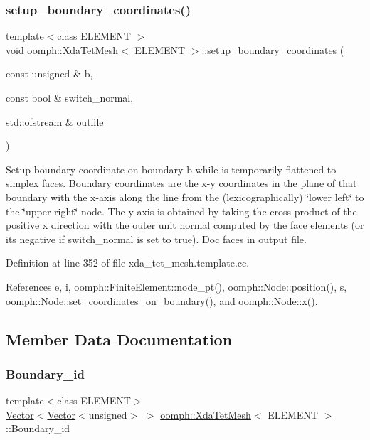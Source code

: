 \subsubsection{\texorpdfstring{setup\+\_\+boundary\+\_\+coordinates()}{setup\_boundary\_coordinates()}\hspace{0.1cm}{\footnotesize\ttfamily [2/2]}}
{\footnotesize\ttfamily template$<$class E\+L\+E\+M\+E\+NT $>$ \\
void \hyperlink{classoomph_1_1XdaTetMesh}{oomph\+::\+Xda\+Tet\+Mesh}$<$ E\+L\+E\+M\+E\+NT $>$\+::setup\+\_\+boundary\+\_\+coordinates (\begin{DoxyParamCaption}\item[{const unsigned \&}]{b,  }\item[{const bool \&}]{switch\+\_\+normal,  }\item[{std\+::ofstream \&}]{outfile }\end{DoxyParamCaption})}

Setup boundary coordinate on boundary b while is temporarily flattened to simplex faces. Boundary coordinates are the x-\/y coordinates in the plane of that boundary with the x-\/axis along the line from the (lexicographically) \char`\"{}lower left\char`\"{} to the \char`\"{}upper right\char`\"{} node. The y axis is obtained by taking the cross-\/product of the positive x direction with the outer unit normal computed by the face elements (or its negative if switch\+\_\+normal is set to true). Doc faces in output file. 

Definition at line 352 of file xda\+\_\+tet\+\_\+mesh.\+template.\+cc.



References e, i, oomph\+::\+Finite\+Element\+::node\+\_\+pt(), oomph\+::\+Node\+::position(), s, oomph\+::\+Node\+::set\+\_\+coordinates\+\_\+on\+\_\+boundary(), and oomph\+::\+Node\+::x().



\subsection{Member Data Documentation}
\mbox{\label{classoomph_1_1XdaTetMesh_a1774abc96e730c89e95b99933a7c0ae3}} 
\subsubsection{\texorpdfstring{Boundary\+\_\+id}{Boundary\_id}}
{\footnotesize\ttfamily template$<$class E\+L\+E\+M\+E\+NT$>$ \\
\hyperlink{classoomph_1_1Vector}{Vector}$<$\hyperlink{classoomph_1_1Vector}{Vector}$<$unsigned$>$ $>$ \hyperlink{classoomph_1_1XdaTetMesh}{oomph\+::\+Xda\+Tet\+Mesh}$<$ E\+L\+E\+M\+E\+NT $>$\+::Boundary\+\_\+id\hspace{0.3cm}{\ttfamily [private]}}



